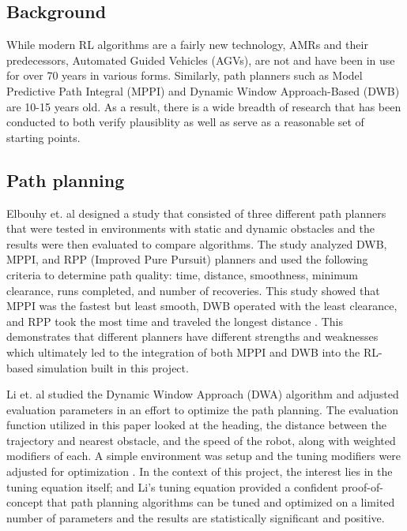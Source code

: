 \documentclass[conference]{IEEEtran}
\begin{document}
    \subsection{Background}
    While modern RL algorithms are a fairly new technology, AMRs and their predecessors, Automated Guided Vehicles (AGVs), are not and have been in
    use for over 70 years in various forms. Similarly, path planners such as Model Predictive Path Integral (MPPI) and Dynamic Window Approach-Based
    (DWB) are 10-15 years old. As a result, there is a wide breadth of research that has been conducted to both verify plausiblity as well as serve
    as a reasonable set of starting points.
        
        \subsection{Path planning}
        Elbouhy et. al designed a study that consisted of three different path planners that were tested in environments with static and dynamic
        obstacles and the results were then evaluated to compare algorithms. The study analyzed DWB, MPPI, and RPP (Improved Pure Pursuit) planners
        and used the following criteria to determine path quality: time, distance, smoothness, minimum clearance, runs completed, and number of
        recoveries. This study showed that MPPI was the fastest but least smooth, DWB operated with the least clearance, and RPP took the most time
        and traveled the longest distance \cite{b1}. This demonstrates that different planners have different strengths and weaknesses which
        ultimately led to the integration of both MPPI and DWB into the RL-based simulation built in this project.
        
        Li et. al studied the Dynamic Window Approach (DWA) algorithm and adjusted evaluation parameters in an effort to optimize the path planning.
        The evaluation function utilized in this paper looked at the heading, the distance between the trajectory and nearest obstacle, and the speed
        of the robot, along with weighted modifiers of each. A simple environment was setup and the tuning modifiers were adjusted for optimization
        \cite{b2}. In the context of this project, the interest lies in the tuning equation itself; and Li's tuning equation provided a 
        confident proof-of-concept that path planning algorithms can be tuned and optimized on a limited number of parameters and the results are
        statistically significant and positive.
\end{document}

